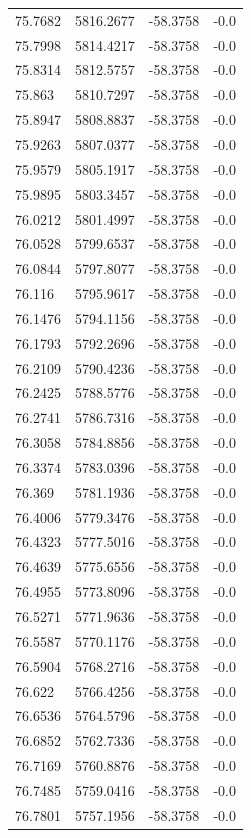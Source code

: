 \begin{table}[H]
\begin{tabular}{llll}
75.7682 & 5816.2677 & -58.3758 & -0.0 \\
75.7998 & 5814.4217 & -58.3758 & -0.0 \\
75.8314 & 5812.5757 & -58.3758 & -0.0 \\
75.863 & 5810.7297 & -58.3758 & -0.0 \\
75.8947 & 5808.8837 & -58.3758 & -0.0 \\
75.9263 & 5807.0377 & -58.3758 & -0.0 \\
75.9579 & 5805.1917 & -58.3758 & -0.0 \\
75.9895 & 5803.3457 & -58.3758 & -0.0 \\
76.0212 & 5801.4997 & -58.3758 & -0.0 \\
76.0528 & 5799.6537 & -58.3758 & -0.0 \\
76.0844 & 5797.8077 & -58.3758 & -0.0 \\
76.116 & 5795.9617 & -58.3758 & -0.0 \\
76.1476 & 5794.1156 & -58.3758 & -0.0 \\
76.1793 & 5792.2696 & -58.3758 & -0.0 \\
76.2109 & 5790.4236 & -58.3758 & -0.0 \\
76.2425 & 5788.5776 & -58.3758 & -0.0 \\
76.2741 & 5786.7316 & -58.3758 & -0.0 \\
76.3058 & 5784.8856 & -58.3758 & -0.0 \\
76.3374 & 5783.0396 & -58.3758 & -0.0 \\
76.369 & 5781.1936 & -58.3758 & -0.0 \\
76.4006 & 5779.3476 & -58.3758 & -0.0 \\
76.4323 & 5777.5016 & -58.3758 & -0.0 \\
76.4639 & 5775.6556 & -58.3758 & -0.0 \\
76.4955 & 5773.8096 & -58.3758 & -0.0 \\
76.5271 & 5771.9636 & -58.3758 & -0.0 \\
76.5587 & 5770.1176 & -58.3758 & -0.0 \\
76.5904 & 5768.2716 & -58.3758 & -0.0 \\
76.622 & 5766.4256 & -58.3758 & -0.0 \\
76.6536 & 5764.5796 & -58.3758 & -0.0 \\
76.6852 & 5762.7336 & -58.3758 & -0.0 \\
76.7169 & 5760.8876 & -58.3758 & -0.0 \\
76.7485 & 5759.0416 & -58.3758 & -0.0 \\
76.7801 & 5757.1956 & -58.3758 & -0.0 \\

\end{tabular}
\end{table}
